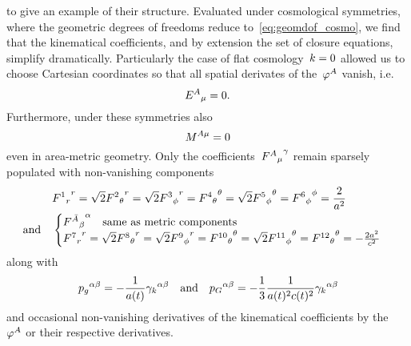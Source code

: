 to give an example of their structure. Evaluated under cosmological symmetries, where the geometric degrees of freedoms reduce to~\eqref{eq:geomdof_cosmo}, we find that the kinematical coefficients, and by extension the set of closure equations, simplify dramatically. Particularly the case of flat cosmology~$k=0$ allowed us to choose Cartesian coordinates so that all spatial derivates of the~$\varphi^A$ vanish, i.e.
\begin{equation}
	{E^{A}}_{\mu}=0
	\mathpunct{.}
\end{equation}
Furthermore, under these symmetries also
\begin{equation}
	M^{A \mu}=0
\end{equation}
even in area-metric geometry. Only the coefficients~${{F^{A}}_{\mu}}^{\gamma}$ remain sparsely populated with non-vanishing components
\begin{align}
	&{{F^{1}}_{r}}^{r}=\sqrt{2}{{F^{2}}_{\theta}}^{r}=\sqrt{2}{{F^{3}}_{\phi}}^{r}={{F^{4}}_{\theta}}^{\theta}=\sqrt{2}{{F^{5}}_{\phi}}^{\theta}={{F^{6}}_{\phi}}^{\phi}=\frac{2}{a^2}\\
	\text{and} \quad &\begin{cases}
		{{F^{{\bar{A}}}}_{\beta}}^{\alpha} \quad \text{same as metric components}\\
		{{F^{7}}_{r}}^{r}=\sqrt{2}{{F^{8}}_{\theta}}^{r}=\sqrt{2}{{F^{9}}_{\phi}}^{r}={{F^{10}}_{\theta}}^{\theta}=\sqrt{2}{{F^{11}}_{\phi}}^{\theta}={{F^{12}}_{\theta}}^{\theta}=-\frac{2a^2}{c^2}
	\end{cases}
\end{align}
along with
\begin{equation}
	{p_g}^{\alpha\beta}=-\frac{1}{a(t)}{\gamma_{k}}^{\alpha\beta} \quad \text{and} \quad {p_G}^{\alpha\beta}=-\frac{1}{3}\frac{1}{a(t)^2c(t)^2}{\gamma_{k}}^{\alpha\beta}
\end{equation}
and occasional non-vanishing derivatives of the kinematical coefficients by the~$\varphi^A$ or their respective derivatives.

